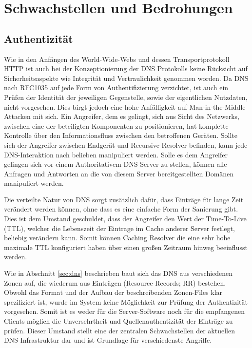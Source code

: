 \chapter{Schwachstellen und Bedrohungen}
\label{chap:threads}


\section{Authentizität}
\label{sec:Thread-Auth}

Wie in den Anfängen des World-Wide-Webs und dessen Transportprotokoll HTTP ist auch bei der Konzeptionierung der DNS Protokolls keine Rücksicht auf Sicherheitsaspekte wie Integrität und Vertraulichkeit genommen worden. Da DNS nach RFC1035 auf jede Form von Authentifizierung verzichtet, ist auch ein Prüfen der Identität der jeweiligen Gegenstelle, sowie der eigentlichen Nutzdaten, nicht vorgesehen. Dies birgt jedoch eine hohe Anfälligkeit auf Man-in-the-Middle Attacken mit sich. Ein Angreifer, dem es gelingt, sich aus Sicht des Netzwerks, zwischen eine der beteiligten Komponenten zu positionieren, hat komplette Kontrolle über den Informationsfluss zwischen den betroffenen Geräten. Sollte sich der Angreifer zwischen Endgerät und Recursive Resolver befinden, kann jede DNS-Interaktion nach belieben manipuliert werden. Solle es dem Angreifer gelingen sich vor einem Authoritativem DNS-Server zu stellen, können alle Anfragen und Antworten an die von diesem Server bereitgestellten Domänen manipuliert werden. 

Die verteilte Natur von DNS sorgt zusätzlich dafür, dass Einträge für lange Zeit verändert werden können, ohne dass es eine einfache Form der Sanierung gibt. Dies ist dem Umstand geschuldet, dass der Angreifer den Wert der Time-To-Live (TTL), welcher die Lebenszeit der Eintrage im Cache anderer Server festlegt, beliebig verändern kann. Somit können Caching Resolver die eine sehr hohe maximale TTL konfiguriert haben über einen großen Zeitraum hinweg beeinflusst werden.

Wie in Abschnitt \ref{sec:dns} beschrieben baut sich das DNS aus verschiedenen Zonen auf, die wiederum aus Einträgen (Resource Records; RR) bestehen. Obwohl das Format und der Aufbau der beschreibenden Zonen-Files klar spezifiziert ist, wurde im System keine Möglichkeit zur Prüfung der Authentizität vorgesehen. Somit ist es weder für die Server-Software noch für die empfangenen Clients möglich die Unversehrtheit und Quellenauthentizität der Einträge zu prüfen. Dieser Umstand stellt eine der zentralen Schwachstellen der aktuellen DNS Infrastruktur dar und ist Grundlage für verschiedenste Angriffe.

